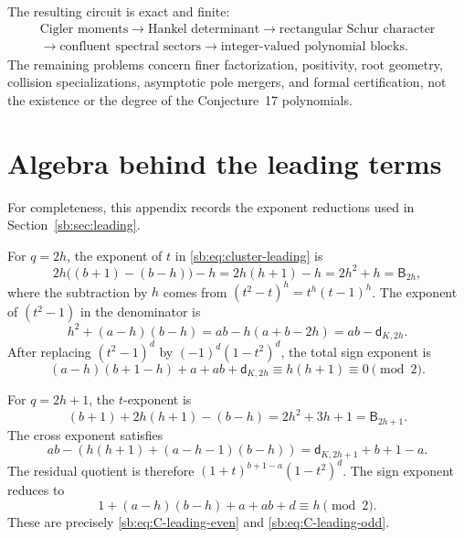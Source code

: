 \documentclass[11pt]{article}
\theoremstyle{definition}
\theoremstyle{remark}
\newcommand{\Btri}{\mathsf B}
\newcommand{\dq}{\mathsf d}
\theoremstyle{definition}
\theoremstyle{plain}
\numberwithin{equation}{section}
\begin{document}
The resulting circuit is exact and finite:
\[
 \begin{gathered}
 \text{Cigler moments}
 \longrightarrow \text{Hankel determinant}
 \longrightarrow \text{rectangular Schur character}\\
 \longrightarrow \text{confluent spectral sectors}
 \longrightarrow \text{integer-valued polynomial blocks}.
 \end{gathered}
\]
The remaining problems concern finer factorization, positivity, root geometry,
collision specializations, asymptotic pole mergers, and formal certification,
not the existence or the degree of the Conjecture~17 polynomials.

\clearpage
\renewcommand{\thesection}{\Alph{section}}
\renewcommand{\theHsection}{sb.app.\Alph{section}}
\setcounter{section}{7}
\section{Algebra behind the leading terms}
\label{sb:app:leading-algebra}
For completeness, this appendix records the exponent reductions used in
Section~\ref{sb:sec:leading}.

For $q=2h$, the exponent of $t$ in \eqref{sb:eq:cluster-leading} is
\[
 2h\bigl((b+1)-(b-h)\bigr)-h
 =2h(h+1)-h=2h^2+h=\Btri_{2h},
\]
where the subtraction by $h$ comes from
$(t^2-t)^h=t^h(t-1)^h$.  The exponent of $(t^2-1)$ in the denominator is
\[
 h^2+(a-h)(b-h)=ab-h(a+b-2h)=ab-\dq_{K,2h}.
\]
After replacing $(t^2-1)^d$ by $(-1)^d(1-t^2)^d$, the total sign exponent is
\[
 (a-h)(b+1-h)+a+ab+\dq_{K,2h}
 \equiv h(h+1)\equiv0\pmod2.
\]

For $q=2h+1$, the $t$-exponent is
\[
 (b+1)+2h(h+1)-(b-h)=2h^2+3h+1=\Btri_{2h+1}.
\]
The cross exponent satisfies
\[
 ab-\left(h(h+1)+(a-h-1)(b-h)\right)
 =\dq_{K,2h+1}+b+1-a.
\]
The residual quotient is therefore $(1+t)^{b+1-a}(1-t^2)^d$.  The sign
exponent reduces to
\[
 1+(a-h)(b-h)+a+ab+d\equiv h\pmod2.
\]
These are precisely \eqref{sb:eq:C-leading-even} and
\eqref{sb:eq:C-leading-odd}.
\end{document}
